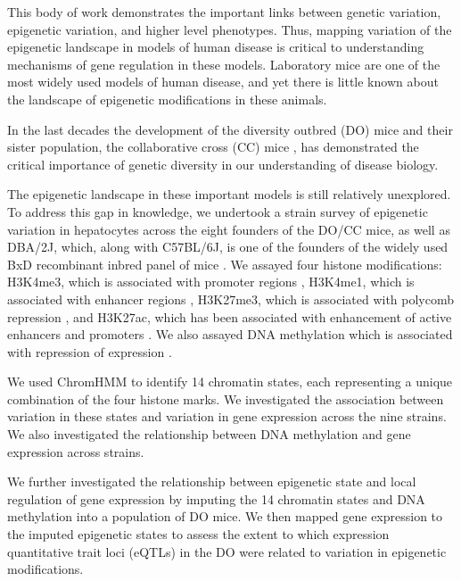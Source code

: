 \documentclass[
  11pt,
]{article}
\begin{document}
This body of work demonstrates the important links between genetic
variation, epigenetic variation, and higher level phenotypes. Thus,
mapping variation of the epigenetic landscape in models of human disease
is critical to understanding mechanisms of gene regulation in these
models. Laboratory mice are one of the most widely used models of human
disease, and yet there is little known about the landscape of epigenetic
modifications in these animals.

In the last decades the development of the diversity outbred (DO) mice
\citep{Svenson:2012hq, churchill2012diversity, 
koyuncu2021cxcl1, kurtz2020diversity, bogue2015collaborative, 
kebede2014insights, keller2019gene} and their sister population, the
collaborative cross (CC) mice \citep{threadgill2011collaborative, 
threadgill2012ten, durrant2011collaborative, mao2015identification, 
graham2021baseline}, has demonstrated the critical importance of genetic
diversity in our understanding of disease biology.

The epigenetic landscape in these important models is still relatively
unexplored. To address this gap in knowledge, we undertook a strain
survey of epigenetic variation in hepatocytes across the eight founders
of the DO/CC mice, as well as DBA/2J, which, along with C57BL/6J, is one
of the founders of the widely used BxD recombinant inbred panel of mice
\citep{Ashbrook:2019bd}. We assayed four histone modifications: H3K4me3,
which is associated with promoter regions
\citep{heintzman2007distinct, pmid15680324}, H3K4me1, which is
associated with enhancer regions \citep{heintzman2007distinct},
H3K27me3, which is associated with polycomb repression
\citep{bonasio2010molecular}, and H3K27ac, which has been associated
with enhancement of active enhancers and promoters
\citep{creyghton2010histone, heintzman2009histone, rada2011unique}. We
also assayed DNA methylation which is associated with repression of
expression \citep{moore2013dna, jones2012functions}.

We used ChromHMM \citep{Ernst:2012ii} to identify 14 chromatin states,
each representing a unique combination of the four histone marks. We
investigated the association between variation in these states and
variation in gene expression across the nine strains. We also
investigated the relationship between DNA methylation and gene
expression across strains.

We further investigated the relationship between epigenetic state and
local regulation of gene expression by imputing the 14 chromatin states
and DNA methylation into a population of DO mice. We then mapped gene
expression to the imputed epigenetic states to assess the extent to
which expression quantitative trait loci (eQTLs) in the DO were related
to variation in epigenetic modifications.
\end{document}
